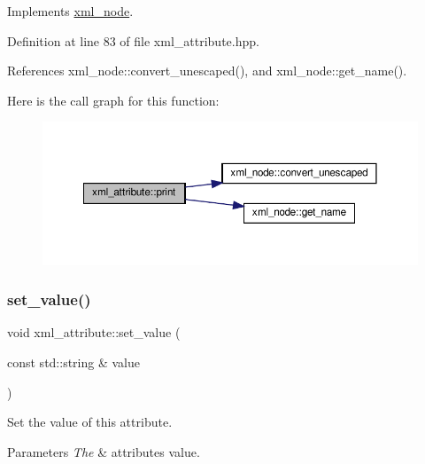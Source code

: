 Implements \hyperlink{classxml__node_a150e224e18301e5842d10a5e47cc2661}{xml\+\_\+node}.



Definition at line 83 of file xml\+\_\+attribute.\+hpp.



References xml\+\_\+node\+::convert\+\_\+unescaped(), and xml\+\_\+node\+::get\+\_\+name().

Here is the call graph for this function\+:
\nopagebreak
\begin{figure}[H]
\begin{center}
\leavevmode
\includegraphics[width=350pt]{d8/dd2/classxml__attribute_a854917ba5c6dcf1ab04d5ef3151cade6_cgraph}
\end{center}
\end{figure}
\mbox{\label{classxml__attribute_a957e710a1b24e0f175a663d4a4ab1ced}} 
\subsubsection{\texorpdfstring{set\+\_\+value()}{set\_value()}}
{\footnotesize\ttfamily void xml\+\_\+attribute\+::set\+\_\+value (\begin{DoxyParamCaption}\item[{const std\+::string \&}]{value }\end{DoxyParamCaption})\hspace{0.3cm}{\ttfamily [inline]}}



Set the value of this attribute. 


\begin{DoxyParams}{Parameters}
{\em The} & attribute\textquotesingle{}s value. \\
\hline
\end{DoxyParams}


